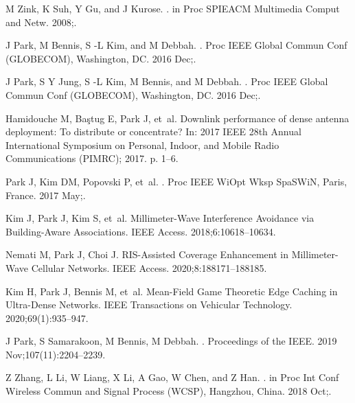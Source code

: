\documentclass{book}
\begin{document}
\begin{thebibliography}{10}
  {M  Zink, K  Suh, Y  Gu, and J  Kurose}.
  .
  \newblock in Proc SPIEACM Multimedia Comput and Netw. 2008;.
  
  {J  Park, M  Bennis, S -L  Kim, and M  Debbah}.
  .
  \newblock Proc IEEE Global Commun Conf (GLOBECOM), Washington, DC. 2016 Dec;.
  
  {J  Park, S  Y  Jung, S -L  Kim, M  Bennis, and M  Debbah}.
  .
  \newblock Proc IEEE Global Commun Conf (GLOBECOM), Washington, DC. 2016 Dec;.
  
  {Hamidouche} M, {Ba{\c s}tug} E, {Park} J, et~al.
  \newblock Downlink performance of dense antenna deployment: To distribute or
    concentrate?
  \newblock In: 2017 IEEE 28th Annual International Symposium on Personal,
    Indoor, and Mobile Radio Communications (PIMRC); 2017. p. 1--6.
  
  Park J, Kim DM, Popovski P, et~al.
  .
  \newblock Proc IEEE WiOpt Wksp SpaSWiN, Paris, France. 2017 May;.
  
  {Kim} J, {Park} J, {Kim} S, et~al.
  \newblock Millimeter-Wave Interference Avoidance via Building-Aware
    Associations.
  \newblock IEEE Access. 2018;6:10618--10634.
  
  {Nemati} M, {Park} J, {Choi} J.
  \newblock RIS-Assisted Coverage Enhancement in Millimeter-Wave Cellular
    Networks.
  \newblock IEEE Access. 2020;8:188171--188185.
  
  {Kim} H, {Park} J, {Bennis} M, et~al.
  \newblock Mean-Field Game Theoretic Edge Caching in Ultra-Dense Networks.
  \newblock IEEE Transactions on Vehicular Technology. 2020;69(1):935--947.
  
  {J  Park, S  Samarakoon, M  Bennis, M  Debbah}.
  .
  \newblock Proceedings of the IEEE. 2019 Nov;107(11):2204--2239.
  
  {Z  Zhang, L  Li, W  Liang, X  Li, A  Gao, W  Chen, and Z Han}.
  .
  \newblock in Proc Int Conf Wireless Commun and Signal Process (WCSP), Hangzhou,
    China. 2018 Oct;.
  

\end{thebibliography}
\end{document}
